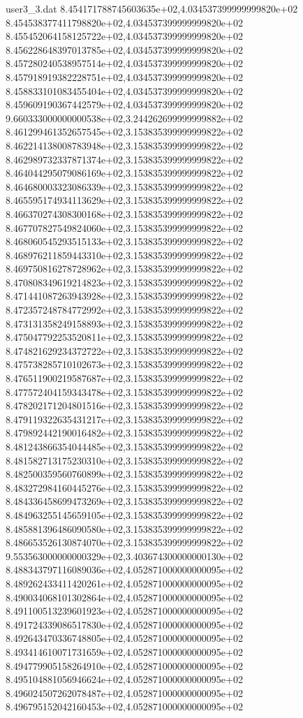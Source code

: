 \begin{filecontents}{user3_3.dat}
8.454171788745603635e+02,4.034537399999999820e+02
8.454538377411798820e+02,4.034537399999999820e+02
8.455452064158125722e+02,4.034537399999999820e+02
8.456228648397013785e+02,4.034537399999999820e+02
8.457280240538957514e+02,4.034537399999999820e+02
8.457918919382228751e+02,4.034537399999999820e+02
8.458833101083455404e+02,4.034537399999999820e+02
8.459609190367442579e+02,4.034537399999999820e+02
9.660333000000000538e+02,3.244262699999999882e+02
8.461299461352657545e+02,3.153835399999999822e+02
8.462214138008783948e+02,3.153835399999999822e+02
8.462989732337871374e+02,3.153835399999999822e+02
8.464044295079086169e+02,3.153835399999999822e+02
8.464680003323086339e+02,3.153835399999999822e+02
8.465595174934113629e+02,3.153835399999999822e+02
8.466370274308300168e+02,3.153835399999999822e+02
8.467707827549824060e+02,3.153835399999999822e+02
8.468060545293515133e+02,3.153835399999999822e+02
8.468976211859443310e+02,3.153835399999999822e+02
8.469750816278728962e+02,3.153835399999999822e+02
8.470808349619214823e+02,3.153835399999999822e+02
8.471441087263943928e+02,3.153835399999999822e+02
8.472357248784772992e+02,3.153835399999999822e+02
8.473131358249158893e+02,3.153835399999999822e+02
8.475047792253520811e+02,3.153835399999999822e+02
8.474821629234372722e+02,3.153835399999999822e+02
8.475738285710102673e+02,3.153835399999999822e+02
8.476511900219587687e+02,3.153835399999999822e+02
8.477572404159343478e+02,3.153835399999999822e+02
8.478202171204801516e+02,3.153835399999999822e+02
8.479119322635431217e+02,3.153835399999999822e+02
8.479892442190016482e+02,3.153835399999999822e+02
8.481243866354044485e+02,3.153835399999999822e+02
8.481582713175230310e+02,3.153835399999999822e+02
8.482500359560760899e+02,3.153835399999999822e+02
8.483272984160445276e+02,3.153835399999999822e+02
8.484336458699473269e+02,3.153835399999999822e+02
8.484963255145659105e+02,3.153835399999999822e+02
8.485881396486090580e+02,3.153835399999999822e+02
8.486653526130874070e+02,3.153835399999999822e+02
9.553563000000000329e+02,3.403674300000000130e+02
8.488343797116089036e+02,4.052871000000000095e+02
8.489262433411420261e+02,4.052871000000000095e+02
8.490034068101302864e+02,4.052871000000000095e+02
8.491100513239601923e+02,4.052871000000000095e+02
8.491724339086517830e+02,4.052871000000000095e+02
8.492643470336748805e+02,4.052871000000000095e+02
8.493414610071731659e+02,4.052871000000000095e+02
8.494779905158264910e+02,4.052871000000000095e+02
8.495104881056946624e+02,4.052871000000000095e+02
8.496024507262078487e+02,4.052871000000000095e+02
8.496795152042160453e+02,4.052871000000000095e+02

\end{filecontents}
